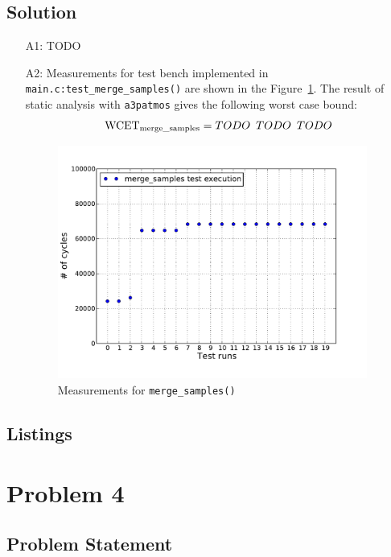 \documentclass[12pt,a4paper,titlepage,oneside]{article}
\begin{document}
\subsection{Solution}
\begin{itemize}

\item[A1:]
  TODO

\item[A2:]
  Measurements for test bench implemented in
  \texttt{main.c:test\_merge\_samples()} are shown in the
  Figure~\ref{fig:mergeSamples}.
	The result of static analysis with \texttt{a3patmos} gives the
	following worst case bound:
  $$\text{WCET}_{\text{merge\_samples}} = TODO\enskip TODO\enskip TODO$$

\begin{figure}[hb!]
  \centering
  \includegraphics[width=4in]{q3_2_merge_samples}
  \caption
  {Measurements for \texttt{merge\_samples()}}
	\label{fig:mergeSamples}
\end{figure}

\end{itemize}

\subsection{Listings}

\newpage
\section{Problem 4}

\subsection{Problem Statement}

\end{document}
